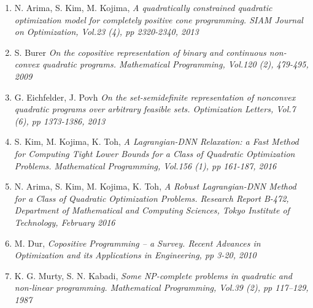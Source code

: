 \documentclass[12pt]{book}
\theoremstyle{definition}
\begin{document}
\begin{enumerate}
\item N. Arima, S. Kim, M. Kojima, \it A quadratically constrained quadratic optimization model
for completely positive cone programming. \rm SIAM Journal on Optimization, Vol.23 (4), pp 2320-2340, 2013
\label{ArimaKimKojimaQCQPforCPP}
%
\item S. Burer \it On the copositive representation of binary and continuous non- convex quadratic
programs. \rm Mathematical Programming, Vol.120 (2), 479-495, 2009
\label{BurerCPPreprOfBinLCQP}
%
\item G. Eichfelder, J. Povh \it On the set-semidefinite representation of nonconvex quadratic
programs over arbitrary feasible sets. \rm Optimization Letters, Vol.7 (6), pp 1373-1386, 2013
\label{EichfelderPovhSetSDPreprOfQCQP}
%
\item S. Kim, M. Kojima, K. Toh, \it A Lagrangian-DNN Relaxation: a Fast Method for Computing Tight Lower
Bounds for a Class of Quadratic Optimization Problems. \rm  Mathematical Programming, Vol.156 (1), pp 161-187, 2016
\label{KimKojimaLagrangianDNNRelaxation1}
%
\item N. Arima, S. Kim, M. Kojima, K. Toh, \it A Robust Lagrangian-DNN Method for
a Class of Quadratic Optimization Problems. \rm Research Report B-472, Department of Mathematical
and Computing Sciences, Tokyo Institute of Technology, February 2016
\label{ArimaKimKojimaRobustLagrangianDNN}
%
\item M. Dur, \it Copositive Programming – a Survey. \rm Recent Advances in Optimization and its Applications in Engineering, pp 3-20, 2010
\label{DurCopositiveSurvey}
% 
\item K. G. Murty, S. N. Kabadi, \it Some NP-complete problems in quadratic and non-linear
programming. \rm Mathematical Programming, Vol.39 (2), pp 117–129, 1987
\label{MurtyNPcompleteQP}




\end{enumerate}
\end{document}
